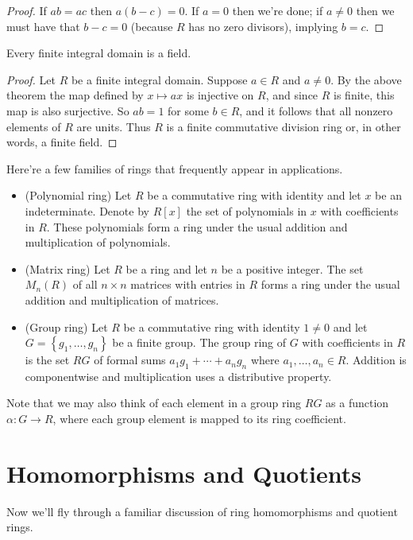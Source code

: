 \documentclass[../m171main.tex]{subfiles}
\begin{document}
\begin{proof}
    If $ab = ac$ then $a(b-c) = 0$.
    If $a=0$ then we're done; if $a \neq 0$ then we must have that $b - c = 0$ (because $R$ has no zero divisors), implying $b = c$.
\end{proof}

\begin{corollary}[]
    Every finite integral domain is a field.
\end{corollary}

\begin{proof}
    Let $R$ be a finite integral domain.
    Suppose $a \in R$ and $a \neq 0$.
    By the above theorem the map defined by $x \mapsto ax$ is injective on $R$, and since $R$ is finite, this map is also surjective.
    So $ab = 1$ for some $b \in R$, and it follows that all nonzero elements of $R$ are units.
    Thus $R$ is a finite commutative division ring or, in other words, a finite field.
\end{proof}

Here're a few families of rings that frequently appear in applications.
\begin{itemize}[topsep=0pt]
    \item (Polynomial ring) Let $R$ be a commutative ring with identity and let $x$ be an indeterminate.
    Denote by $R[x]$ the set of polynomials in $x$ with coefficients in $R$.
    These polynomials form a ring under the usual addition and multiplication of polynomials.

    \item (Matrix ring) Let $R$ be a ring and let $n$ be a positive integer.
    The set $M_n(R)$ of all $n \times n$ matrices with entries in $R$ forms a ring under the usual addition and multiplication of matrices.

    \item (Group ring) Let $R$ be a commutative ring with identity $1 \neq 0$ and let $G = \left\{ g_1, \ldots, g_n \right\}$ be a finite group.
    The group ring of $G$ with coefficients in $R$ is the set $RG$ of formal sums $a_1g_1 + \cdots + a_n g_n$ where $a_1, \ldots, a_n \in R$.
    Addition is componentwise and multiplication uses a distributive property.
\end{itemize}
Note that we may also think of each element in a group ring $RG$ as a function $\alpha : G \to R$, where each group element is mapped to its ring coefficient.

\section{Homomorphisms and Quotients}
Now we'll fly through a familiar discussion of ring homomorphisms and quotient rings.
\end{document}
